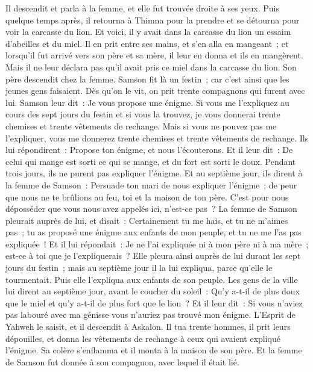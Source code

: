 \begin{multicols}{2}
Il descendit et parla à la femme, et elle fut trouvée droite à ses yeux.
Puis quelque temps après, il retourna à Thimna pour la prendre et se détourna pour voir la carcasse du lion. Et voici, il y avait dans la carcasse du lion un essaim d'abeilles et du miel.
Il en prit entre ses mains, et s'en alla en mangeant~; et lorsqu'il fut arrivé vers son père et sa mère, il leur en donna et ils en mangèrent. Mais il ne leur déclara pas qu'il avait pris ce miel dans la carcasse du lion.
Son père descendit chez la femme. Samson fit là un festin~; car c'est ainsi que les jeunes gens faisaient.
Dès qu'on le vit, on prit trente compagnons qui furent avec lui.
Samson leur dit~: Je vous propose une énigme. Si vous me l'expliquez au cours des sept jours du festin et si vous la trouvez, je vous donnerai trente chemises et trente vêtements de rechange.
Mais si vous ne pouvez pas me l'expliquer, vous me donnerez trente chemises et trente vêtements de rechange. Ils lui répondirent~: Propose ton énigme, et nous l'écouterons.
Et il leur dit~: De celui qui mange est sorti ce qui se mange, et du fort est sorti le doux. Pendant trois jours, ils ne purent pas expliquer l'énigme.
Et au septième jour, ils dirent à la femme de Samson~: Persuade ton mari de nous expliquer l'énigme~; de peur que nous ne te brûlions au feu, toi et la maison de ton père. C'est pour nous déposséder que vous nous avez appelés ici, n'est-ce pas~?
La femme de Samson pleurait auprès de lui, et disait~: Certainement tu me hais, et tu ne m'aimes pas~; tu as proposé une énigme aux enfants de mon peuple, et tu ne me l'as pas expliquée~! Et il lui répondait~: Je ne l'ai expliquée ni à mon père ni à ma mère~; est-ce à toi que je l'expliquerais~?
Elle pleura ainsi auprès de lui durant les sept jours du festin~; mais au septième jour il la lui expliqua, parce qu'elle le tourmentait. Puis elle l'expliqua aux enfants de son peuple.
Les gens de la ville lui dirent au septième jour, avant le coucher du soleil~: Qu'y a-t-il de plus doux que le miel et qu'y a-t-il de plus fort que le lion~? Et il leur dit~: Si vous n'aviez pas labouré avec ma génisse vous n'auriez pas trouvé mon énigme.
L'Esprit de Yahweh le saisit, et il descendit à Askalon. Il tua trente hommes, il prit leurs dépouilles, et donna les vêtements de rechange à ceux qui avaient expliqué l'énigme. Sa colère s'enflamma et il monta à la maison de son père.
Et la femme de Samson fut donnée à son compagnon, avec lequel il était lié.

\end{multicols}
